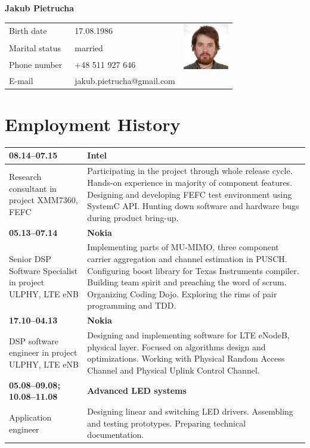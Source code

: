 \documentclass{report}
\begin{document}
\def\thesection{}
\def\thepage{}
\def\thefootnote{}
\begin{center}
	\textbf{\Large{Jakub Pietrucha}}
	\vspace{0.3cm}
\end{center}

\begin{tabular}{p{2.5cm}|p{9cm} r} 
Birth date    & \ 17.08.1986 &\multirow{3}{*}{\includegraphics[width=20mm]{photo.eps}} 	\\
Marital status& \ married\\
Phone number  & \ +48 511 927 646\\
E-mail        & \ jakub.pietrucha@gmail.com \\
\end{tabular} 

\section{Employment History}
\begin{tabular}{p{5cm} p{10cm}}
\textbf{08.14--07.15} &\textbf{Intel}\\
\hline
Research consultant in project XMM7360, FEFC
&Participating in the project through whole release cycle. Hands-on experience in majority of component features. Designing and developing FEFC test environment using SystemC API. Hunting down software and hardware bugs during product bring-up. \\
\textbf{05.13--07.14} &\textbf{Nokia}\\
\hline
Senior DSP Software Specialist in project ULPHY, LTE eNB
&Implementing parts of MU-MIMO, three component carrier aggregation and channel estimation in PUSCH. Configuring boost library for Texas Instruments compiler. Building team spirit and preaching the word of scrum. Organizing Coding Dojo. Exploring the rims of pair programming and TDD.\\
\textbf{17.10--04.13} &\textbf{Nokia}\\
\hline
DSP software engineer in project ULPHY, LTE eNB
&Designing and implementing software for LTE eNodeB, physical layer. Focused on algorithms design and optimizations. Working with Physical Random Access Channel and Physical Uplink Control Channel.\\
\textbf{05.08--09.08; 10.08--11.08} &\textbf{Advanced LED systems}\\
\hline
Application engineer
&Designing linear and switching LED drivers. Assembling and
testing prototypes. Preparing technical documentation.
\end{tabular}
\end{document}
